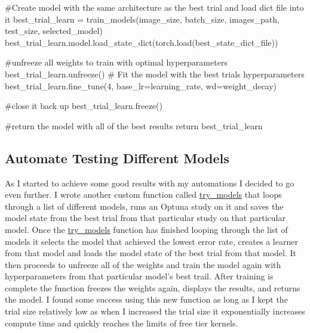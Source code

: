 \documentclass[
  letterpaper,
  DIV=11,
  numbers=noendperiod]{scrartcl}
\newenvironment{Shaded}{\begin{snugshade}}{\end{snugshade}}
\newcommand{\CommentTok}[1]{\textcolor[rgb]{0.37,0.37,0.37}{#1}}
\newcommand{\ControlFlowTok}[1]{\textcolor[rgb]{0.00,0.23,0.31}{#1}}
\newcommand{\DecValTok}[1]{\textcolor[rgb]{0.68,0.00,0.00}{#1}}
\newcommand{\NormalTok}[1]{\textcolor[rgb]{0.00,0.23,0.31}{#1}}
\newcommand{\OperatorTok}[1]{\textcolor[rgb]{0.37,0.37,0.37}{#1}}
\begin{document}
\begin{Shaded}
\begin{Highlighting}[]
    \CommentTok{\#Create model with the same architecture as the best trial and load dict file into it}
\NormalTok{    best\_trial\_learn }\OperatorTok{=}\NormalTok{ train\_models(image\_size, batch\_size, images\_path, test\_size, selected\_model)}
\NormalTok{    best\_trial\_learn.model.load\_state\_dict(torch.load(best\_state\_dict\_file))}

    \CommentTok{\#unfreeze all weights to train with optimal hyperparameters}
\NormalTok{    best\_trial\_learn.unfreeze()}
    \CommentTok{\# Fit the model with the best trial\textquotesingle{}s hyperparameters}
\NormalTok{    best\_trial\_learn.fine\_tune(}\DecValTok{4}\NormalTok{, base\_lr}\OperatorTok{=}\NormalTok{learning\_rate, wd}\OperatorTok{=}\NormalTok{weight\_decay)}

    \CommentTok{\#close it back up}
\NormalTok{    best\_trial\_learn.freeze()}

    \CommentTok{\#return the model with all of the best results}
    \ControlFlowTok{return}\NormalTok{ best\_trial\_learn}
\end{Highlighting}
\end{Shaded}

\hypertarget{automate-testing-different-models}{%
\subsection{Automate Testing Different
Models}\label{automate-testing-different-models}}

As I started to achieve some good results with my automations I decided
to go even further. I wrote another custom function called
\protect\hyperlink{custom-trymodels}{try\_models} that loops through a
list of different models, runs an Optuna study on it and saves the model
state from the best trial from that particular study on that particular
model. Once the \protect\hyperlink{custom-trymodels}{try\_models}
function has finished looping through the list of models it selects the
model that achieved the lowest error rate, creates a learner from that
model and loads the model state of the best trial from that model. It
then proceeds to unfreeze all of the weights and train the model again
with hyperparameters from that particular model's best trail. After
training is complete the function freezes the weights again, displays
the results, and returns the model. I found some success using this new
function as long as I kept the trial size relatively low as when I
increased the trial size it exponentially increases compute time and
quickly reaches the limits of free tier kernels.
\end{document}
